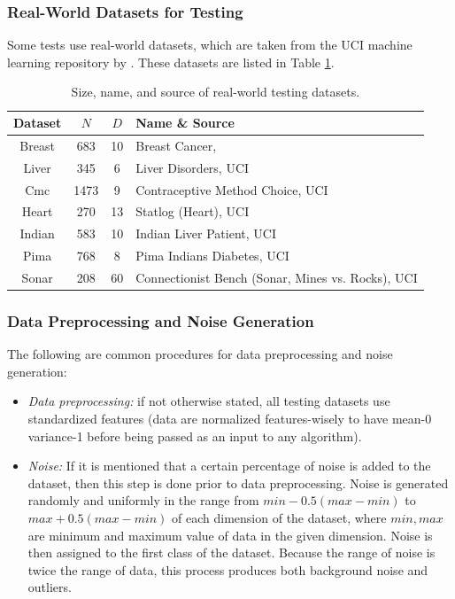 \subsubsection{Real-World Datasets for Testing}

Some tests use real-world datasets, which are taken from the UCI machine learning repository by \cite{ucidata}. These datasets are listed in Table \ref{tab:datasets}.

\begin{table}[htbp!]
\centering
\begin{tabular}{c  c c l}
\hline\hline
Dataset & $N$ & $D$ & Name \& Source \\
\hline
Breast & 683 & 10 & Breast Cancer, \cite{breast} \\
Liver & 345 & 6 & Liver Disorders, UCI \\
Cmc & 1473 & 9 & Contraceptive Method Choice, UCI\\
Heart & 270 & 13 & Statlog (Heart), UCI\\
Indian & 583 & 10 & Indian Liver Patient, UCI\\
Pima & 768 & 8 & Pima Indians Diabetes, UCI\\
Sonar & 208 & 60 & Connectionist Bench (Sonar, Mines vs. Rocks), UCI\\
\hline\hline
\end{tabular}
\caption{Size, name, and source of real-world testing datasets.} 
\label{tab:datasets}
\end{table}

\subsubsection{Data Preprocessing and Noise Generation}
The following are common procedures for data preprocessing and noise generation:
\begin{itemize}
\item \emph{Data preprocessing:} if not otherwise stated, all testing datasets use standardized features (data are normalized features-wisely to have mean-0 variance-1 before being passed as an input to any algorithm). 
\item \emph{Noise:} If it is mentioned that a certain percentage of noise is added to the dataset, then this step is done prior to data preprocessing. Noise is generated randomly and uniformly in the range from $min - 0.5(max-min)$ to $max + 0.5(max-min)$ of each dimension of the dataset, where $min, max$ are minimum and maximum value of data in the given dimension. Noise is then assigned to the first class of the dataset. Because the range of noise is twice the range of data, this process produces both background noise and outliers.
\end{itemize}


